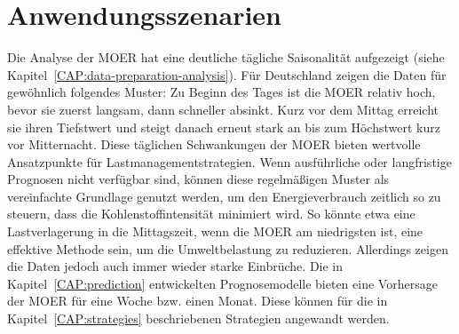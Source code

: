 \section{Anwendungsszenarien}\label{CAP:scenarios}
Die Analyse der \ac{MOER} hat eine deutliche tägliche Saisonalität aufgezeigt (siehe Kapitel~\ref{CAP:data-preparation-analysis}).
Für Deutschland zeigen die Daten für gewöhnlich folgendes Muster:
Zu Beginn des Tages ist die \ac{MOER} relativ hoch, bevor sie zuerst langsam, dann schneller absinkt.
Kurz vor dem Mittag erreicht sie ihren Tiefstwert und steigt danach erneut stark an bis zum Höchstwert kurz vor Mitternacht.
Diese täglichen Schwankungen der \ac{MOER} bieten wertvolle Ansatzpunkte für Lastmanagementstrategien.
Wenn ausführliche oder langfristige Prognosen nicht verfügbar sind, können diese regelmäßigen Muster als vereinfachte Grundlage genutzt werden, um den Energieverbrauch zeitlich so zu steuern, dass die Kohlenstoffintensität minimiert wird.
So könnte etwa eine Lastverlagerung in die Mittagszeit, wenn die \ac{MOER} am niedrigsten ist, eine effektive Methode sein, um die Umweltbelastung zu reduzieren.
Allerdings zeigen die Daten jedoch auch immer wieder starke Einbrüche.
Die in Kapitel~\ref{CAP:prediction} entwickelten Prognosemodelle bieten eine Vorhersage der \ac{MOER} für eine Woche bzw. einen Monat.
Diese können für die in Kapitel~\ref{CAP:strategies} beschriebenen Strategien angewandt werden.

